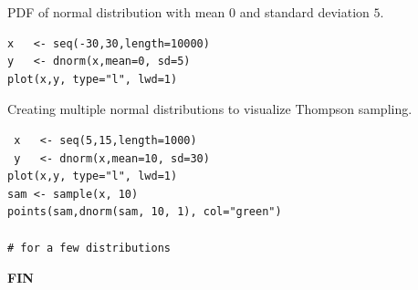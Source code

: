 \documentclass[12pt, a4paper, pdflatex]{report}
\begin{document}
\label{snip:normaldist}PDF of normal distribution with mean $0$ and standard deviation $5$.
\begin{lstlisting}
x   <- seq(-30,30,length=10000)
y   <- dnorm(x,mean=0, sd=5)
plot(x,y, type="l", lwd=1)
\end{lstlisting}

\label{snip:thompsonsampling}Creating multiple normal distributions to visualize Thompson sampling.
\begin{lstlisting}
 x   <- seq(5,15,length=1000)
 y   <- dnorm(x,mean=10, sd=30)
plot(x,y, type="l", lwd=1)
sam <- sample(x, 10)
points(sam,dnorm(sam, 10, 1), col="green")

# for a few distributions
\end{lstlisting}


\newpage
\begin{center} \textbf{\huge \vspace*{15pt} FIN~\cite{berry+firstedt}} \end{center}

{}

\end{document}
